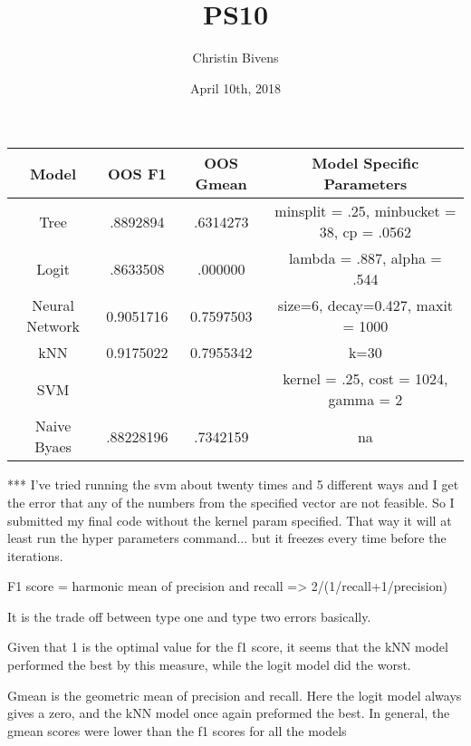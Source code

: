 \documentclass{article}
\title{PS10}
\author{Christin Bivens }
\date{April 10th, 2018}
\begin{document}
\maketitle

\begin{center}
\begin{tabular}{ c|c|c|c }
 Model & OOS F1 & OOS Gmean & Model Specific Parameters\\
 \hline
 Tree & .8892894 & .6314273 & minsplit = .25, minbucket = 38, cp = .0562 \\ 
 \hline
 Logit & .8633508 & .000000 & lambda = .887, alpha = .544 \\  
 \hline
 Neural Network & 0.9051716 & 0.7597503 & size=6, decay=0.427, maxit = 1000\\
 \hline
 kNN & 0.9175022 & 0.7955342 & k=30 \\
 \hline
 SVM & & & kernel = .25, cost = 1024, gamma = 2\\
 \hline
 Naive Byaes & .88228196 & .7342159 & na\\
\end{tabular}
\end{center}

*** I've tried running the svm about twenty times and 5 different ways and I get the error that any of the numbers from the specified vector are not feasible. So I submitted my final code without the kernel param specified. That way it will at least run the hyper parameters command... but it freezes every time before the iterations.

F1 score = harmonic mean of precision and recall => 2/(1/recall+1/precision)

It is the trade off between type one and type two errors basically. 

Given that 1 is the optimal value for the f1 score, it seems that the kNN model performed the best by this measure, while the logit model did the worst.

Gmean is the geometric mean of precision and recall. 
Here the logit model always gives a zero, and the kNN model once again preformed the best. In general, the gmean scores were lower than the f1 scores for all the models
\end{document}
